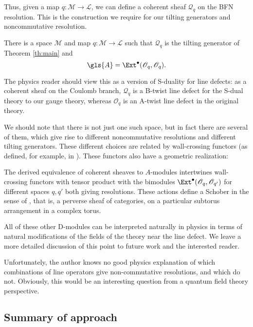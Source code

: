 Thus, given a map  $q\colon \mathcal{M}\to \mathcal{L}$, we can define a coherent
sheaf $\mathcal{Q}_q$ on the BFN resolution.  This is the construction
we require for our tilting generators and noncommutative resolution.
\begin{itheorem}
  There is a space  $\mathcal{M}$ and map $q\colon \mathcal{M}\to \mathcal{L}$ such
  that $ \mathcal{Q}_q$ is the tilting generator of Theorem
  \ref{th:main} and  \[\gls{A}=\Ext^\bullet(\mathscr{O}_{q},
    \mathscr{O}_{q}).\]
\end{itheorem}
\begin{physics}
  The physics reader should view this as a version of S-duality for
  line defects: as a coherent sheaf on the Coulomb branch,
  $\mathcal{Q}_q$ is a B-twist line defect for the S-dual theory to
  our gauge theory, whereas $\mathscr{O}_{q}$ is an A-twist line
  defect in the original theory.
\end{physics}
We should note that there is not just one such space, but in fact
there are several of them, which give rise to different noncommutative
resolutions and different tilting generators.  These different choices
are related by wall-crossing
functors (as defined, for example, in \cite[\S
2.5.1]{losev2017modular}).  These functors also have a geometric
realization:
\begin{itheorem}
The derived equivalence of coherent sheaves to $A$-modules
intertwines wall-crossing functors with tensor product with the
bimodules $\Ext^\bullet(\mathscr{O}_{q},
    \mathscr{O}_{q'})$ for different spaces $q,q'$ both giving
    resolutions.  These
actions define a Schober in the sense of \cite{KSschobers}, that is,
a perverse sheaf of categories, on a particular subtorus arrangement
in a complex torus.  
\end{itheorem}  
\begin{physics}
  All of these other D-modules can be interpreted naturally in physics
  in terms of natural modifications of the fields of the theory near
  the line defect.  We leave a more detailed discussion of this point
  to future work and the interested reader.

  Unfortunately, the author knows no good physics explanation of
  which combinations of line operators give non-commutative
  resolutions, and which do not.  Obviously, this would be an
  interesting question from a quantum field theory perspective.   
\end{physics}

\subsection{Summary of approach}
\label{sec:summary}

